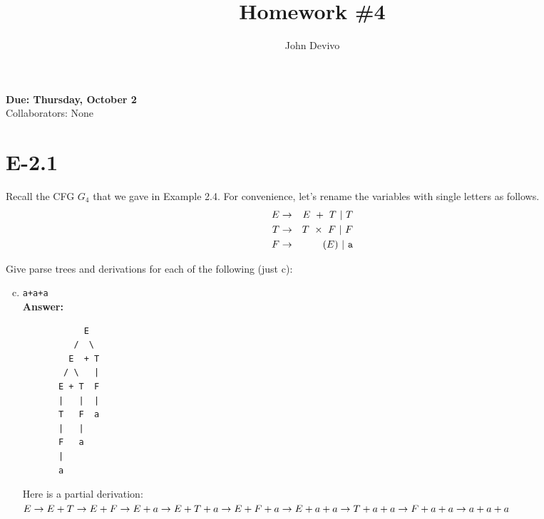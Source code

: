 \documentclass{article}
\author{John Devivo}          %
\title{Homework \#4}       %
\begin{document}
\maketitle
\begin{center}     %
\Large{\bf Due: Thursday, October 2}\\
Collaborators: None
\end{center}       %

\section*{E-2.1} %
Recall the CFG $G_4$ that we gave in Example 2.4. 
For convenience, let's rename the variables with single letters as follows.
\begin{eqnarray*}
E & \rightarrow & E\ +\ T\ |\ T\\
T & \rightarrow & T\ \times\ F\ |\ F\\
F & \rightarrow & (E)\ |\ \verb=a=
\end{eqnarray*}

Give parse trees and derivations for each of the following (just c):
\begin{enumerate}[a.]
\setcounter{enumi}{2}
\item \verb=a+a+a=\\
{\bf Answer: } %
\begin{verbatim}
            E
          /  \
         E  + T
        / \   |
       E + T  F
       |   |  |
       T   F  a
       |   |
       F   a
       |
       a
\end{verbatim}
Here is a partial derivation:\\

$E\rightarrow \\
E + T\rightarrow \\
E + F\rightarrow \\
E + a\rightarrow \\
E + T + a\rightarrow \\
E + F + a\rightarrow \\
E + a + a\rightarrow \\
T + a + a\rightarrow \\
F + a + a\rightarrow \\
a + a + a
$
\end{enumerate}
\end{document}
